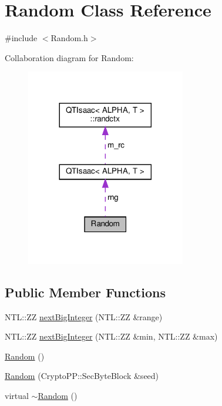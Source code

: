 \hypertarget{classRandom}{}\section{Random Class Reference}
\label{classRandom}


{\ttfamily \#include $<$Random.\+h$>$}



Collaboration diagram for Random\+:
\nopagebreak
\begin{figure}[H]
\begin{center}
\leavevmode
\includegraphics[width=197pt]{classRandom__coll__graph}
\end{center}
\end{figure}
\subsection*{Public Member Functions}
\begin{DoxyCompactItemize}
\item 
N\+T\+L\+::\+ZZ \hyperlink{classRandom_a5347f94bb53028350ad9f46c375aae45}{next\+Big\+Integer} (N\+T\+L\+::\+ZZ \&range)
\item 
N\+T\+L\+::\+ZZ \hyperlink{classRandom_a1d267162c75edb3792dcf29f3125f265}{next\+Big\+Integer} (N\+T\+L\+::\+ZZ \&min, N\+T\+L\+::\+ZZ \&max)
\item 
\hyperlink{classRandom_acb76b49c3903a3c4fb67fd216341f08d}{Random} ()
\item 
\hyperlink{classRandom_a828e4af348ebff33c0785980a4ff4d38}{Random} (Crypto\+P\+P\+::\+Sec\+Byte\+Block \&seed)
\item 
virtual \hyperlink{classRandom_ac0d4eaf1f32df4600eb321cb8dbc0c55}{$\sim$\+Random} ()
\end{DoxyCompactItemize}
